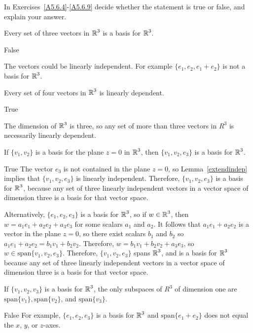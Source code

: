 \documentclass{ximera}
\begin{document}
In Exercises~\ref{A5.6.4}-\ref{A5.6.9} decide whether the statement is true or false, and explain your answer.

\begin{exercise}  \label{A5.6.4}
Every set of three vectors in $\mbox{$\Bbb{R}$}^3$ is a basis for $\mbox{$\Bbb{R}$}^3$.
\begin{solution}
\ans False  

\soln
The vectors could be linearly independent. For example $\{e_1,e_2,e_1+e_2\}$ is not a basis for $\mbox{$\Bbb{R}$}^3$.
\end{solution}
\end{exercise}

\begin{exercise}  \label{A5.6.5}
Every set of four vectors in $\mbox{$\Bbb{R}$}^3$ is linearly dependent.
\begin{solution}
\ans True

\soln
The dimension of $\mbox{$\Bbb{R}$}^3$ is three, so any set of more than three vectors in $R^3$ is necessarily linearly dependent.
\end{solution}
\end{exercise}

\begin{exercise}  \label{A5.6.6}
If $\{v_1,v_2\}$ is a basis for the plane $z = 0$ in $\mbox{$\Bbb{R}$}^3$, then $\{v_1,v_2,e_3\}$ is a basis for $\mbox{$\Bbb{R}$}^3$.
\begin{solution}
\ans True
\soln
The vector $e_3$ is not contained in the plane $z=0$, so Lemma~\ref{extendindep} implies that $\{v_1,v_2,e_3\}$  is linearly independent. Therefore, $\{v_1,v_2,e_3\}$  is a basis for $\mbox{$\Bbb{R}$}^3$, because any set of three linearly independent vectors in a vector space of dimension three is a basis for that vector space. 

Alternatively, $\{e_1,e_2,e_3\}$ is a basis for $\mbox{$\Bbb{R}$}^3$, so if $w\in \mbox{$\Bbb{R}$}^3$, then $w = a_1 e_1 +a_2 e_2 +a_3 e_3$ for some scalars $a_1$ and $a_2$. It follows that $a_1 e_1 + a_2 e_2$ is a vector in the plane $z=0$, so there exist scalars $b_1$ and $b_2$ so $a_1 e_1+ a_2 e_2 = b_1 v_1 +b_2 v_2$. Therefore, $w = b_1 v_1 + b_2 v_2 + a_3 e_3$, so $w\in \text{span}\{v_1,v_2,e_3\}$. Therefore, $\{v_1,v_2,e_3\}$ spans $\mbox{$\Bbb{R}$}^3$, and is a basis for $\mbox{$\Bbb{R}$}^3$ because any set of three linearly independent vectors in a vector space of dimension three is a basis for that vector space. 
\end{solution}
\end{exercise}

\begin{exercise}  \label{A5.6.7}
If $\{v_1,v_2,v_3\}$ is a basis for $\mbox{$\Bbb{R}$}^3$, the only subspaces of $R^3$ of dimension one are $\text{span}\{v_1\}, \text{span}\{v_2\}$, and $\text{span}\{v_3\}$. 
\begin{solution}
\ans False 
\soln For example, $\{e_1,e_2,e_3\}$ is a basis for $\mbox{$\Bbb{R}$}^3$ and $\text{span}\{e_1+e_2\}$ does not equal the $x$, $y$, or $z$-axes.
\end{solution}
\end{exercise}
\end{document}
